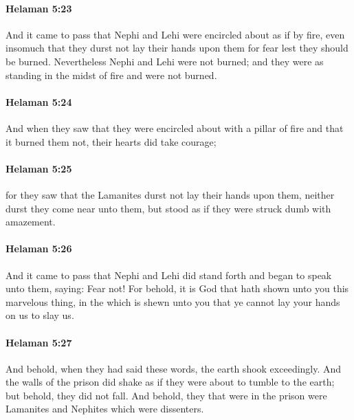 		\paragraph{Helaman 5:23} %
			\label{HELAMAN-5-23}

			And it came to pass that
			Nephi and Lehi were encircled about as if by fire,
			even insomuch that they durst not lay their hands upon them
			for fear lest they should be burned.
			Nevertheless Nephi and Lehi were not burned;
			and they were as standing in the midst of fire and were not burned.

		\paragraph{Helaman 5:24} %
			\label{HELAMAN-5-24}

			And when they saw
			that they were encircled about with a pillar of fire
			and that it burned them not,
			their hearts did take courage;

		\paragraph{Helaman 5:25} %
			\label{HELAMAN-5-25}

			for they saw that the Lamanites durst not lay their hands upon them,
			neither durst they come near unto them,
			but stood as if they were struck dumb with amazement.

		\paragraph{Helaman 5:26} %
			\label{HELAMAN-5-26}

			And it came to pass that Nephi and Lehi did stand forth
			and began to speak unto them, saying:
			Fear not!
			For behold, it is God that hath shown unto you this marvelous thing,
			in the which is shewn unto you
			that ye cannot lay your hands on us to slay us.

		\paragraph{Helaman 5:27} %
			\label{HELAMAN-5-27}

			And behold, when they had said these words,
			the earth shook exceedingly.
			And the walls of the prison did shake
			as if they were about to tumble to the earth;
			but behold, they did not fall.
			And behold, they that were in the prison
			were Lamanites and Nephites which were dissenters.

